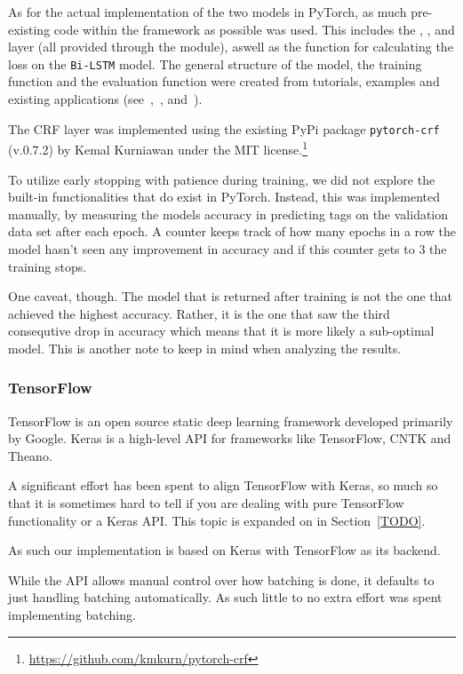 As for the actual implementation of the two models in PyTorch, as much
pre-existing code within the framework as possible was used. This includes the
, ,  and  layer (all
provided through the  module), aswell as the
 function for calculating the loss on the
\texttt{Bi-LSTM} model. The general structure of the model, the training
function and the evaluation function were created from tutorials, examples and
existing applications (see~\cite{pytorch2017lstm},~\cite{yang2018ncrf},
and~\cite{pytorch2018examples}).

The CRF layer was implemented using the existing PyPi package
\texttt{pytorch-crf} (v.0.7.2) by Kemal Kurniawan under the MIT
license.\footnote{\url{https://github.com/kmkurn/pytorch-crf}}

To utilize early stopping with patience during training, we did not explore the
built-in functionalities that do exist in PyTorch. Instead, this was implemented
manually, by measuring the models accuracy in predicting tags on the validation
data set after each epoch. A counter keeps track of how many epochs in a row the
model hasn't seen any improvement in accuracy and if this counter gets to 3 the
training stops.

One caveat, though. The model that is returned after training is not the one
that achieved the highest accuracy. Rather, it is the one that saw the third
consequtive drop in accuracy which means that it is more likely a sub-optimal
model. This is another note to keep in mind when analyzing the results.


\subsubsection*{TensorFlow}
TensorFlow is an open source static deep learning framework developed primarily
by Google. Keras is a high-level API for frameworks like TensorFlow, CNTK and
Theano.

A significant effort has been spent to align TensorFlow with Keras, so much so
that it is sometimes hard to tell if you are dealing with pure TensorFlow
functionality or a Keras API\@. This topic is expanded on in Section~\ref{TODO}.

As such our implementation is based on Keras with TensorFlow as its
backend.

While the API allows manual control over how batching is done, it defaults to
just handling batching automatically. As such little to no extra effort was
spent implementing batching.

